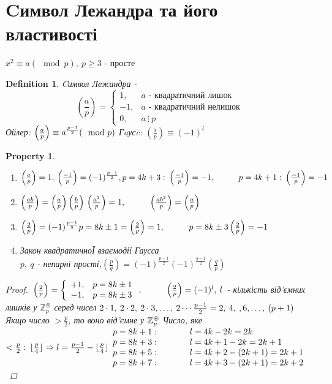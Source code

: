 \documentclass[a4paper,12pt]{bookest}
\newtheorem{definition}{Definition}[section]
\newtheorem*{property*}{Property}
\newcommand\tab[1][1cm]{\hspace*{#1}}
\begin{document}
\section{Cимвол Лежандра та його властивості}
$x^2\equiv a(\mod p),\>p\geq 3$ - просте
\begin{definition}Cимвол Лежандра -
	$$\left(\frac ap\right)=\left\{\begin{array}{ll}
	1, & a\textrm{ - квадратичний лишок}\\
	-1, & a\textrm{ - квадратичний нелишок}	\\
	0, & a\>\vdots\>p
	\end{array}\right.$$
	Ойлер: $\left(\frac ap\right)\equiv a^{\frac{p-1}{2}}(\mod p)\\$
	Гaусc: $\left(\frac ap\right)\equiv (-1)^l$
\end{definition}
\begin{property*}$ $
	\begin{enumerate}
		\item $\left(\frac ap\right)=1,\>\left(\frac {-1}p\right)=(-1)^{\frac{p-1}{2}},\\ p=4k+3:\>\left(\frac {-1}p\right)=-1,\tab p=4k+1:\>\left(\frac {-1}p\right)=-1$
		\item $\left(\frac {ab}p\right)=\left(\frac ap\right)\left(\frac bp\right)\\\left(\frac {a^2}p\right)=1,\tab \left(\frac {ab^2}p\right)=\left(\frac ap\right)$
		\item $\left(\frac 2p\right)=(-1)^{\frac{p-1}{8}}\\p=8k\pm 1=\left(\frac 2p\right)=1,\tab p=8k\pm3\left(\frac 2p\right)=-1$
		\item Закон квадратичноЇ взаємодії Гаусса\\
			$p,\>q$ - непарні прості,\tab $\left(\frac pq\right)=(-1)^{\frac{p-1}{2}}(-1)^{\frac{q-1}{2}}\left(\frac qp\right)$
	\end{enumerate}
	\begin{proof}
		$\\\left(\frac 2p\right)=\left\{\begin{array}{ll}
			+1, & p = 8k\pm1\\
			-1, & p = 8k\pm3
		\end{array}\right.,\tab \left(\frac 2p\right)=(-1)^l,\>l$ - кількість від'ємних лишків у $\mathbb{Z}_p^{\circledast}$ серед чисел $2\cdot1,\>2\cdot2,\>2\cdot3,\dots,\>2\cdots\frac{p-1}{2}=2,\>4,\>,6,\dots,\>(p+1)\\$ Якщо число $>\frac p2$, то воно від'ємне у $\mathbb{Z}_p^{\circledast}\\$ Число, яке $<\frac p2:\>\lfloor\frac p4\rfloor\Rightarrow l=\frac{p-1}{2}-\lfloor\frac p4\rfloor\\\begin{array}{ll}
			p=8k+1:\tab  & l=4k-2k=2k\\
			p=8k+3:\tab  & l=4k+1-2k=2k+1\\
			p=8k+5:\tab  & l=4k+2-(2k+1)=2k+1\\
			p=8k+7:\tab  & l=4k+3-(2k+1)=2k+2
		\end{array}$
	\end{proof}
\end{property*}
\end{document}
